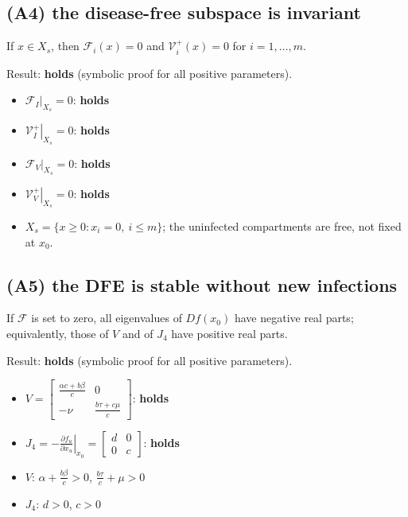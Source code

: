\documentclass{article}
\begin{document}
\subsection*{(A4) the disease-free subspace is invariant}

If $x \in X_s$, then $\mathcal{F}_i(x) = 0$ and $\mathcal{V}_i^+(x) = 0$ for $i = 1,\dots,m$.

Result: \textbf{holds} (symbolic proof for all positive parameters).

\begin{itemize}
  \item $\left.\mathcal{F}_{I}\right\rvert_{X_s} = 0$: \textbf{holds}
  \item $\left.\mathcal{V}_{I}^+\right\rvert_{X_s} = 0$: \textbf{holds}
  \item $\left.\mathcal{F}_{V}\right\rvert_{X_s} = 0$: \textbf{holds}
  \item $\left.\mathcal{V}_{V}^+\right\rvert_{X_s} = 0$: \textbf{holds}
  \item $X_s = \{x \ge 0 : x_i = 0,\ i \le m\}$; the uninfected compartments are free, not fixed at $x_0$.
\end{itemize}

\subsection*{(A5) the DFE is stable without new infections}

If $\mathcal{F}$ is set to zero, all eigenvalues of $Df(x_0)$ have negative real parts; equivalently, those of $V$ and of $J_4$ have positive real parts.

Result: \textbf{holds} (symbolic proof for all positive parameters).

\begin{itemize}
  \item $V = \left[\begin{matrix}\frac{\alpha c + b \beta}{c} & 0\\- \nu & \frac{b \tau + c \mu}{c}\end{matrix}\right]$: \textbf{holds}
  \item $J_4 = -\left.\frac{\partial f_u}{\partial x_u}\right\rvert_{x_0} = \left[\begin{matrix}d & 0\\0 & c\end{matrix}\right]$: \textbf{holds}
  \item $V$: $\alpha + \frac{b \beta}{c} > 0$, $\frac{b \tau}{c} + \mu > 0$
  \item $J_4$: $d > 0$, $c > 0$
\end{itemize}
\end{document}
